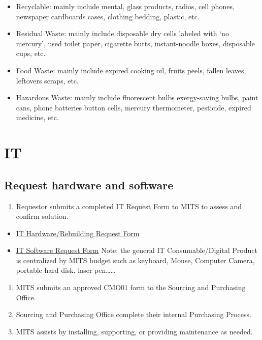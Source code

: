 \documentclass[
]{book}
\providecommand{\tightlist}{%
  \setlength{\itemsep}{0pt}\setlength{\parskip}{0pt}}
\begin{document}
\begin{itemize}
\tightlist
\item
  Recyclable: mainly include mental, glass products, radios, cell phones, newspaper cardboards cases, clothing bedding, plastic, etc.
\item
  Residual Waste: mainly include disposable dry cells labeled with `no mercury', used toilet paper, cigarette butts, instant-noodle boxes, disposable cups, etc.
\item
  Food Waste: mainly include expired cooking oil, fruits peels, fallen leaves, leftovers scraps, etc.
\item
  Hazardous Waste: mainly include fluorescent bulbs exergy-saving bulbs, paint cans, phone batteries button cells, mercury thermometer, pesticide, expired medicine, etc.
\end{itemize}

\hypertarget{it}{%
\chapter{IT}\label{it}}

\hypertarget{request-hardware-and-software}{%
\section{Request hardware and software}\label{request-hardware-and-software}}

\begin{enumerate}
\def\labelenumi{\arabic{enumi}.}
\tightlist
\item
  Requestor submits a completed IT Request Form to MITS to assess and confirm solution.
\end{enumerate}

\begin{itemize}
\tightlist
\item
  \href{https://box.xjtlu.edu.cn/lib/b1e91eec-7498-438e-823c-a6d3ba1727f6/file/Forms/Form-IT\%20Assets\%20Request-Hardware\%20and\%20Rebuilding.doc}{IT Hardware/Rebuilding Request Form}
\item
  \href{https://box.xjtlu.edu.cn/lib/b1e91eec-7498-438e-823c-a6d3ba1727f6/file/Forms/Form-IT\%20Assets\%20Request-Software.doc}{IT Software Request Form}
  Note: the general IT Consumable/Digital Product is centralized by MITS budget such as keyboard, Mouse, Computer Camera, portable hard disk, laser pen\ldots\ldots{}
\end{itemize}

\begin{enumerate}
\def\labelenumi{\arabic{enumi}.}
\setcounter{enumi}{1}
\tightlist
\item
  MITS submits an approved CMO01 form to the Sourcing and Purchasing Office.
\item
  Sourcing and Purchasing Office complete their internal Purchasing Process.
\item
  MITS assists by installing, supporting, or providing maintenance as needed.
\end{enumerate}
\end{document}
